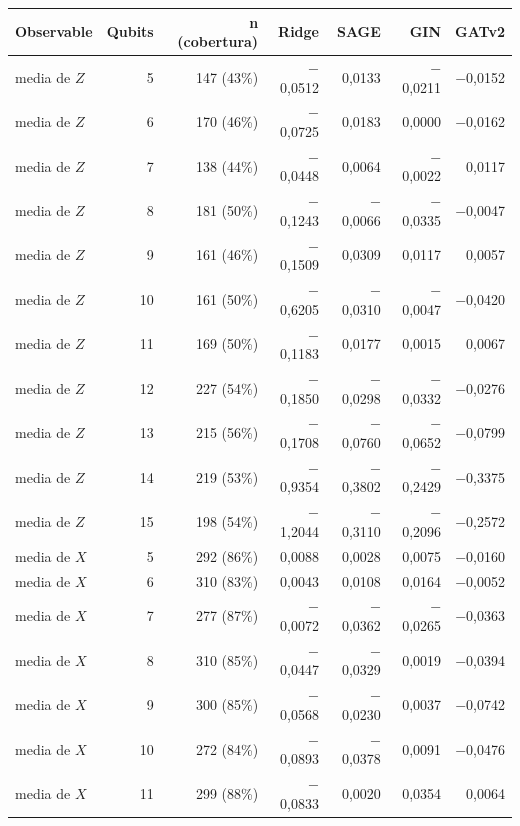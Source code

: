 \begin{table}[htbp]
    \centering
    {\footnotesize
    \begin{tabular}{@{}lrrrrrr@{}}
        \toprule
        \textbf{Observable} & \textbf{Qubits} & \textbf{n (cobertura)} & \textbf{Ridge} & \textbf{SAGE} & \textbf{GIN} & \textbf{GATv2} \\
        \midrule
        media de $Z$ & 5 & 147 (43\%) & $-$0,0512 & 0,0133 & $-$0,0211 & $-$0,0152 \\
        media de $Z$ & 6 & 170 (46\%) & $-$0,0725 & 0,0183 & 0,0000 & $-$0,0162 \\
        media de $Z$ & 7 & 138 (44\%) & $-$0,0448 & 0,0064 & $-$0,0022 & 0,0117 \\
        media de $Z$ & 8 & 181 (50\%) & $-$0,1243 & $-$0,0066 & $-$0,0335 & $-$0,0047 \\
        media de $Z$ & 9 & 161 (46\%) & $-$0,1509 & 0,0309 & 0,0117 & 0,0057 \\
        media de $Z$ & 10 & 161 (50\%) & $-$0,6205 & $-$0,0310 & $-$0,0047 & $-$0,0420 \\
        media de $Z$ & 11 & 169 (50\%) & $-$0,1183 & 0,0177 & 0,0015 & 0,0067 \\
        media de $Z$ & 12 & 227 (54\%) & $-$0,1850 & $-$0,0298 & $-$0,0332 & $-$0,0276 \\
        media de $Z$ & 13 & 215 (56\%) & $-$0,1708 & $-$0,0760 & $-$0,0652 & $-$0,0799 \\
        media de $Z$ & 14 & 219 (53\%) & $-$0,9354 & $-$0,3802 & $-$0,2429 & $-$0,3375 \\
        media de $Z$ & 15 & 198 (54\%) & $-$1,2044 & $-$0,3110 & $-$0,2096 & $-$0,2572 \\
        media de $X$ & 5 & 292 (86\%) & 0,0088 & 0,0028 & 0,0075 & $-$0,0160 \\
        media de $X$ & 6 & 310 (83\%) & 0,0043 & 0,0108 & 0,0164 & $-$0,0052 \\
        media de $X$ & 7 & 277 (87\%) & $-$0,0072 & $-$0,0362 & $-$0,0265 & $-$0,0363 \\
        media de $X$ & 8 & 310 (85\%) & $-$0,0447 & $-$0,0329 & 0,0019 & $-$0,0394 \\
        media de $X$ & 9 & 300 (85\%) & $-$0,0568 & $-$0,0230 & 0,0037 & $-$0,0742 \\
        media de $X$ & 10 & 272 (84\%) & $-$0,0893 & $-$0,0378 & 0,0091 & $-$0,0476 \\
        media de $X$ & 11 & 299 (88\%) & $-$0,0833 & 0,0020 & 0,0354 & 0,0064 \\

\end{tabular}}
\end{table}
